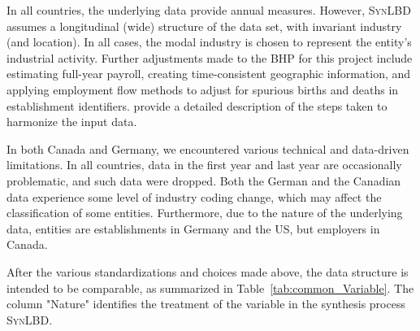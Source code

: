 \documentclass[10pt]{article}
\newcommand{\SynLBD}{\textsc{SynLBD}}
\begin{document}
In all countries, the underlying data provide annual measures. However, \SynLBD{} assumes a longitudinal (wide) structure of the data set, with invariant industry (and location). In all cases, the modal industry is chosen to represent the entity's industrial activity. 
Further adjustments made to the \ac{BHP} for this project include estimating full-year payroll, creating time-consistent geographic information, and applying employment flow methods \citep{RePEc:iab:iabfme:201006_en} to adjust for spurious births and deaths in establishment identifiers. \citet{SJIAOS-2014b} provide a detailed description of the steps taken to harmonize the input data. 


In both Canada and Germany, we encountered various technical and data-driven limitations. In all countries, data in the first year and last year are occasionally problematic, and such data  were dropped. 
Both the German and the Canadian data experience some level of industry coding change, which may affect the classification of some entities. Furthermore, due to the nature of the underlying data, entities are establishments in Germany and the US, but employers in Canada. 

After the various standardizations and choices made above, the data structure is intended to be comparable, as summarized in Table~\ref{tab:common_Variable}. The column "Nature" identifies the treatment of the variable in the synthesis process \SynLBD. 
\end{document}
